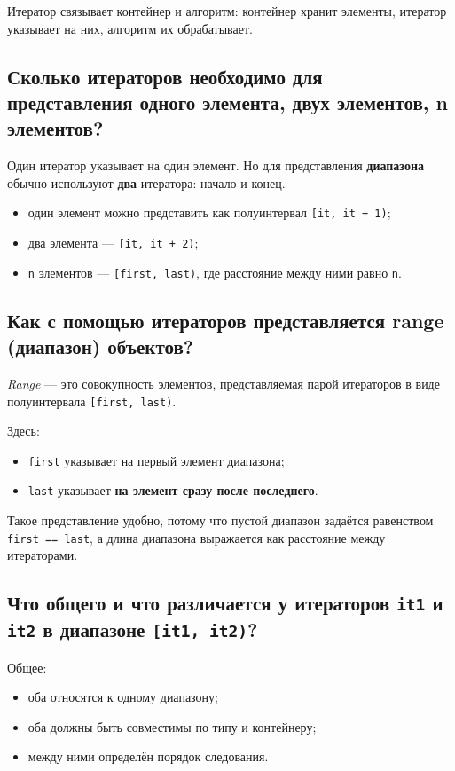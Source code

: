 \begin{remark}
Итератор связывает контейнер и алгоритм: контейнер хранит элементы, итератор указывает на них, алгоритм их обрабатывает.
\end{remark}

\subsection{Сколько итераторов необходимо для представления одного элемента, двух элементов, n элементов?}
Один итератор указывает на один элемент.  
Но для представления \textbf{диапазона} обычно используют \textbf{два} итератора: начало и конец.

\begin{itemize}
    \item один элемент можно представить как полуинтервал \texttt{[it, it + 1)};
    \item два элемента — \texttt{[it, it + 2)};
    \item \texttt{n} элементов — \texttt{[first, last)}, где расстояние между ними равно \texttt{n}.
\end{itemize}

\subsection{Как с помощью итераторов представляется range (диапазон) объектов?}
\begin{definition}[Range]
\textit{Range} — это совокупность элементов, представляемая парой итераторов в виде полуинтервала \texttt{[first, last)}.
\end{definition}

Здесь:
\begin{itemize}
    \item \texttt{first} указывает на первый элемент диапазона;
    \item \texttt{last} указывает \textbf{на элемент сразу после последнего}.
\end{itemize}

\begin{remark}
Такое представление удобно, потому что пустой диапазон задаётся равенством \texttt{first == last}, а длина диапазона выражается как расстояние между итераторами.
\end{remark}

\subsection{Что общего и что различается у итераторов \texttt{it1} и \texttt{it2} в диапазоне \texttt{[it1, it2)}?}
Общее:
\begin{itemize}
    \item оба относятся к одному диапазону;
    \item оба должны быть совместимы по типу и контейнеру;
    \item между ними определён порядок следования.
\end{itemize}

